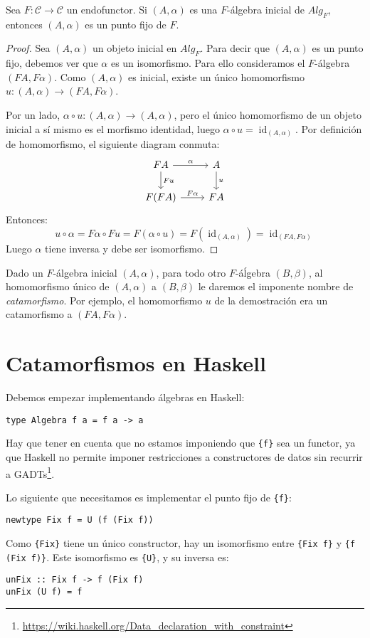 \documentclass[12pt, twoside]{book}
\newcommand{\newterm}[1]{\index{#1}\emph{#1}}
\newcommand{\code}[1]{\Verb+{#1}+}
\newcommand{\cat}{{\mathcal{C}}}
\DeclareMathOperator{\id}{id}
\begin{document}
\begin{lemma}
Sea $F \colon \cat \to \cat$ un endofunctor.
Si $(A,\alpha)$ es una $F$-álgebra inicial de $Alg_F$, entonces $(A,\alpha)$ es un punto fijo de $F$.
\end{lemma}
\begin{proof}
Sea $(A,\alpha)$ un objeto inicial en $Alg_F$.
Para decir que $(A,\alpha)$ es un punto fijo, debemos ver que $\alpha$ es un isomorfismo.
Para ello consideramos el $F$-álgebra $(F A, F \alpha)$.
Como $(A,\alpha)$ es inicial, existe un único homomorfismo $u \colon (A, \alpha) \to (F A, F \alpha)$.

Por un lado, $\alpha \circ u \colon (A, \alpha) \to (A, \alpha)$, pero el único homomorfismo de un objeto inicial a sí mismo es el morfismo identidad, luego $\alpha \circ u = \id_{(A, \alpha)}$.
Por definición de homomorfismo, el siguiente diagram conmuta:
\[
\begin{tikzcd}
F A \arrow[r,"\alpha"] \arrow[d,"F u"] & A \arrow[d,"u"]\\
F (F A) \arrow[r,"F \alpha"] & F A
\end{tikzcd}
\]
Entonces:
\[ u \circ \alpha = F \alpha \circ F u = F (\alpha \circ u) = F (\id_{(A, \alpha)}) = \id_{(F A, F \alpha)} \]
Luego $\alpha$ tiene inversa y debe ser isomorfismo.
\end{proof}

Dado un $F$-álgebra inicial $(A,\alpha)$, para todo otro $F$-áĺgebra $(B,\beta)$, al homomorfismo único de $(A,\alpha)$ a $(B,\beta)$ le daremos el imponente nombre de \newterm{catamorfismo}.
Por ejemplo, el homomorfismo $u$ de la demostración era un catamorfismo a $(F A, F \alpha)$.

\section{Catamorfismos en Haskell}

Debemos empezar implementando álgebras en Haskell:
\begin{verbatim}
type Algebra f a = f a -> a
\end{verbatim}
Hay que tener en cuenta que no estamos imponiendo que \code{f} sea un functor, ya que Haskell no permite imponer restricciones a constructores de datos sin recurrir a GADTs\footnote{\url{https://wiki.haskell.org/Data_declaration_with_constraint}}.

Lo siguiente que necesitamos es implementar el punto fijo de \code{f}:
\begin{verbatim}
newtype Fix f = U (f (Fix f))
\end{verbatim}
Como \code{Fix} tiene un único constructor, hay un isomorfismo entre \code{Fix f} y \code{f (Fix f)}.
Este isomorfismo es \code{U}, y su inversa es:
\begin{verbatim}
unFix :: Fix f -> f (Fix f)
unFix (U f) = f
\end{verbatim}
\end{document}
